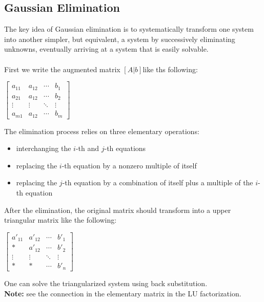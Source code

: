 \documentclass[UTF8,a4paper, 10pt, openany]{book}
\begin{document}
\subsection{Gaussian Elimination}
The key idea of Gaussian elimination is to systematically transform one system into another simpler, but equivalent, a system by successively eliminating unknowns, eventually arriving at a system that is easily solvable.\\
\\First we write the augmented matrix $[A|b]$like ths following:
\begin{center}
$\left[
\begin{array}{ccc|c}
a_{11} & a_{12} & \cdots & b_{1} \\ 
a_{21} & a_{12} & \cdots & b_{2} \\
\vdots & \vdots & \ddots & \vdots \\
a_{m1} & a_{12} & \cdots & b_{m} 
    \end{array}
\right]$
\end{center}
The elimination process relies on three elementary operations:
\begin{itemize}
\item{interchanging the $i$-th and $j$-th equations}
\item{replacing the $i$-th equation by a nonzero multiple of itself}
\item{replacing the $j$-th equation by a combination of itself plus a multiple
of the $i$-th equation}
\end{itemize}
After the elimination, the original matrix should transform into a upper triangular matrix like the following:
\begin{center}
$\left[
\begin{array}{ccc|c}
a'_{11} & a'_{12} & \cdots & b'_{1} \\ 
* & a'_{12} & \cdots & b'_{2} \\
\vdots & \vdots & \ddots & \vdots \\
* & * & \cdots & b'_{n} 
    \end{array}
\right]$
\end{center}
One can solve the triangularized system using back substitution.\\
\textbf{Note: }see the connection in the elementary matrix in the LU factorization.
\end{document}
